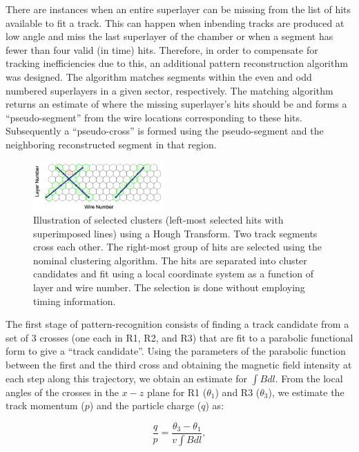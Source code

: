 There are instances when an entire superlayer can be missing from the list of hits available to fit a track. This can
happen when inbending tracks are produced at low angle and miss the last superlayer of the chamber or when a
segment has fewer than four valid (in time) hits. Therefore, in order to compensate for tracking inefficiencies due
to this, an additional pattern reconstruction algorithm was designed.  The algorithm matches segments within the
even and odd numbered superlayers in a given sector, respectively. The matching algorithm returns an estimate of
where the missing superlayer's hits should be and forms a ``pseudo-segment'' from the wire locations corresponding
to these hits. Subsequently a ``pseudo-cross'' is formed using the pseudo-segment and the neighboring reconstructed
segment in that region.

\begin{figure}
\includegraphics[width=0.45\textwidth]{pics/dcPattern14.png}
\caption{Illustration of selected clusters (left-most selected hits with superimposed lines) using a Hough Transform.
  Two track segments cross each other. The right-most group of hits are selected using the nominal clustering
  algorithm. The hits are separated into cluster candidates and fit using a local coordinate system as a function of
  layer and wire number. The selection is done without employing timing information.}
\label{fig:hough}
\end{figure}

The first stage of pattern-recognition consists of finding a track candidate from a set of 3 crosses (one each in R1,
R2, and R3) that are fit to a parabolic functional form to give a ``track candidate''. Using the parameters of the
parabolic function between the first and the third cross and obtaining the magnetic field intensity at each step along
this trajectory, we obtain an estimate for $\int B dl$. From the local angles of the crosses in the $x-z$ plane for R1
($\theta_1$) and R3 ($\theta_3$), we estimate the track momentum ($p$) and the particle charge ($q$) as:

\begin{equation}
  \frac{q}{p} = \frac{\theta_3 - \theta_1}{v\int{B dl}},
\end{equation}

